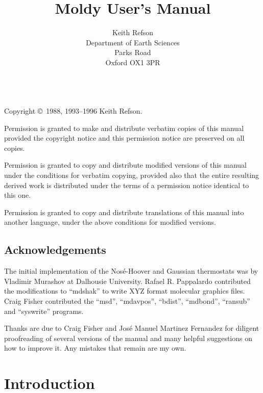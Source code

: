 \documentclass[a4paper,twoside]{report}
\title{Moldy User's Manual}
\author{Keith Refson\\Department of Earth Sciences\\Parks Road
\\Oxford OX1 3PR\\
\htmladdnormallink{Keith.Refson@earth.ox.ac.uk}{mailto:Keith.Refson@earth.ox.ac.uk}\\}
\begin{document}
\maketitle
\thispagestyle{empty}

Copyright \copyright\ 1988, 1993--1996 Keith Refson.

   Permission is granted to make and distribute verbatim copies of this
manual provided the copyright notice and this permission notice are
preserved on all copies.

   Permission is granted to copy and distribute modified versions of
this manual under the conditions for verbatim copying, provided also
that the entire resulting derived work is distributed under the terms
of a permission notice identical to this one.

   Permission is granted to copy and distribute translations of this
manual into another language, under the above conditions for modified
versions.

\section*{Acknowledgements} %
The initial implementation of the Nos\'{e}-Hoover and Gaussian
thermostats was by Vladimir Murashov at Dalhousie University.
Rafael R. Pappalardo contributed the modifications to ``mdshak'' to
write XYZ format molecular graphics files. Craig Fisher contributed
the ``msd'', ``mdavpos'', ``bdist'', ``mdbond'', ``ransub'' and 
``syswrite'' programs.

Thanks are due to Craig Fisher and Jos\'{e} Manuel Martinez Fernandez
for diligent proofreading of several versions of the manual and many
helpful suggestions on how to improve it.  Any mistakes that remain are
my own.

\cleardoublepage
\setcounter{page}{1}
\tableofcontents
\listoftables
\listoffigures

\cleardoublepage
{}
\setcounter{page}{1}
\chapter{Introduction}   %
\end{document}
